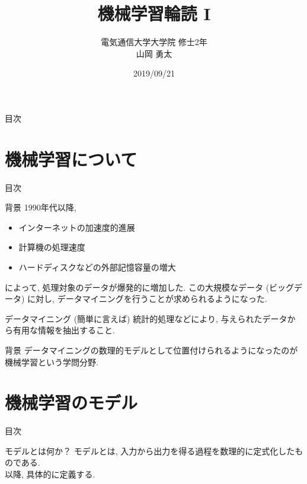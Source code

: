 \documentclass[aspectratio=43, dvipdfmx, 12pt]{beamer}
\title[機械学習の基礎概念]{機械学習輪読 I}
\author{電気通信大学大学院 修士2年 \\ 山岡 勇太}
\date{2019/09/21}
\begin{document}
\maketitle

\begin{frame}{目次}
  \tableofcontents
\end{frame}

\section{機械学習について}

\begin{frame}{目次}
  \tableofcontents[currentsection]
\end{frame}

\begin{frame}{背景}
  1990年代以降,
  \begin{itemize}
    \item インターネットの加速度的進展
    \item 計算機の処理速度
    \item ハードディスクなどの外部記憶容量の増大
  \end{itemize}
  によって, 処理対象のデータが爆発的に増加した.
  この大規模なデータ (\alert{ビッグデータ}) に対し, \alert{データマイニング}を行うことが求められるようになった.

  \begin{alertblock}{データマイニング}
    (簡単に言えば) 統計的処理などにより, 与えられたデータから有用な情報を抽出すること.
  \end{alertblock}
\end{frame}

\begin{frame}{背景}
  データマイニングの数理的モデルとして位置付けられるようになったのが\alert{機械学習}という学問分野.
\end{frame}

\section{機械学習のモデル}

\begin{frame}{目次}
  \tableofcontents[currentsection]
\end{frame}

\begin{frame}{モデルとは何か？}
  モデルとは, \alert{入力から出力を得る過程を数理的に定式化したもの}である.\\
  以降, 具体的に定義する.
\end{frame}
\end{document}
